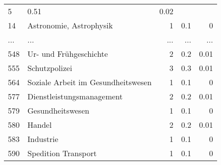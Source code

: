 \begin{longtable}{lXrrr}
          \num{5} &
          \num[round-mode=places,round-precision=2]{0,51} &
          \num[round-mode=places,round-precision=2]{0,02} \\
        14 & \multicolumn{1}{X}{Astronomie, Astrophysik} & %
          \num{1} &
          \num[round-mode=places,round-precision=2]{0,1} &
          \num[round-mode=places,round-precision=2]{0} \\
       ... & ... & ... & ... & ... \\
        548 & \multicolumn{1}{X}{Ur- und Frühgeschichte} & %
          \num{2} &
          \num[round-mode=places,round-precision=2]{0,2} &
          \num[round-mode=places,round-precision=2]{0,01} \\

        555 & \multicolumn{1}{X}{Schutzpolizei} & %
          \num{3} &
          \num[round-mode=places,round-precision=2]{0,3} &
          \num[round-mode=places,round-precision=2]{0,01} \\

        564 & \multicolumn{1}{X}{Soziale Arbeit im Gesundheitswesen} & %
          \num{1} &
          \num[round-mode=places,round-precision=2]{0,1} &
          \num[round-mode=places,round-precision=2]{0} \\

        577 & \multicolumn{1}{X}{Dienstleistungsmanagement} & %
          \num{2} &
          \num[round-mode=places,round-precision=2]{0,2} &
          \num[round-mode=places,round-precision=2]{0,01} \\

        579 & \multicolumn{1}{X}{Gesundheitswesen} & %
          \num{1} &
          \num[round-mode=places,round-precision=2]{0,1} &
          \num[round-mode=places,round-precision=2]{0} \\

        580 & \multicolumn{1}{X}{Handel} & %
          \num{2} &
          \num[round-mode=places,round-precision=2]{0,2} &
          \num[round-mode=places,round-precision=2]{0,01} \\

        583 & \multicolumn{1}{X}{Industrie} & %
          \num{1} &
          \num[round-mode=places,round-precision=2]{0,1} &
          \num[round-mode=places,round-precision=2]{0} \\

        590 & \multicolumn{1}{X}{Spedition Transport} & %
          \num{1} &
          \num[round-mode=places,round-precision=2]{0,1} &
          \num[round-mode=places,round-precision=2]{0} \\


\end{longtable}
